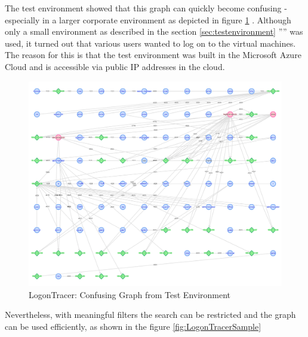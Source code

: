 \clearpage

The test environment showed that this graph can quickly become confusing - especially in a larger corporate environment as depicted in figure \ref{fig:LogonTraceerConfusing} . Although only a small environment as described in the section \ref{sec:testenvironment} '''' was used, it turned out that various users wanted to log on to the virtual machines. The reason for this is that the test environment was built in the Microsoft Azure Cloud and is accessible via public IP addresses in the cloud.

\begin{figure}[H]
    \centering
    \includegraphics[width=0.8\linewidth]{assets/LogonTracer/logontracer_confusing.png}
    \caption{LogonTracer: Confusing Graph from Test Environment}
    \label{fig:LogonTraceerConfusing}
\end{figure}

Nevertheless, with meaningful filters the search can be restricted and the graph can be used efficiently, as shown in the figure \ref{fig:LogonTracerSample} 

\clearpage

